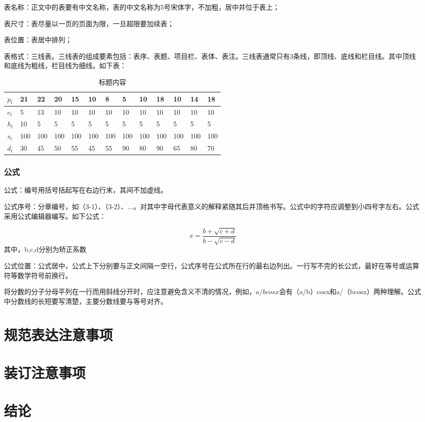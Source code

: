 \documentclass[
	StudentName     = 姓名,
	StudentID       = 学号,
	AdvisorName     = 指导教师,
	Grade           = 年级,
	Major           = 专业,
	Department      = 一个很长很长的名字,
	SubmitYear		= 2022,
	SubmitMonth		= 5,
	Title           = 论文中文题目,
	TitleEng        = {{English Title}}
]{cauc_thesis}
\begin{document}
	表名称：正文中的表要有中文名称，表的中文名称为5号宋体字，不加粗，居中并位于表上；
	
	表尺寸：表尽量以一页的页面为限，一旦超限要加续表；
	
	表位置：表居中排列；
	
	表格式：三线表。三线表的组成要素包括：表序、表题、项目栏、表体、表注。三线表通常只有3条线，即顶线、底线和栏目线。其中顶线和底线为粗线，栏目线为细线。如下表：
	
	\begin{table}[!ht]
		\caption{标题内容}\label{tab:lable}
		\begin{tabular*}{\hsize}{@{}@{\extracolsep{\fill}}lllllllllllll@{}}
			\toprule
			$p_{t}$  &21  &22  &20  &15  &10  &8   &5   &10  &18  &10  &14  &18\\
			\midrule
			$c_{t}$  &5   &13  &10  &10  &10  &10  &10  &10  &10  &10  &10  &10\\
			$h_{t}$  &10  &5   &5   &5   &5   &5   &5   &5   &5   &5   &5   &5 \\
			$s_{t}$  &100 &100 &100 &100 &100 &100 &100 &100 &100 &100 &100 &100\\
			$d_{t}$  &30  &45  &50  &55  &45  &55  &90  &80  &90  &65  &80  &70 \\
			\bottomrule
		\end{tabular*}
	\end{table}
	
	\subsection{公式}
	
	公式：编号用括号括起写在右边行末，其间不加虚线。
	
	公式序号：分章编号，如（3-1）、（3-2）、...。对其中字母代表意义的解释紧随其后并顶格书写。公式中的字符应调整到小四号字左右。公式采用公式编辑器编写。如下公式：
	
	\begin{equation}
		x=\frac{b+\sqrt{c+d}}{b-\sqrt{c-d}}
	\end{equation}
	其中，b,c,d分别为矫正系数
	
	公式位置：公式居中，公式上下分别要与正文间隔一空行，公式序号在公式所在行的最右边列出。一行写不完的长公式，最好在等号或运算符等数学符号前换行。
	
	将分数的分子分母平列在一行而用斜线分开时，应注意避免含义不清的情况，例如，$a\slash bcosx$会有（a/b）cosx和a/（bcosx）两种理解。公式中分数线的长短要写清楚，主要分数线要与等号对齐。
	
	{\centering\chapter{规范表达注意事项}}
	{\centering\chapter{装订注意事项}}
	{\centering\chapter{结论}}
	
\end{document}
